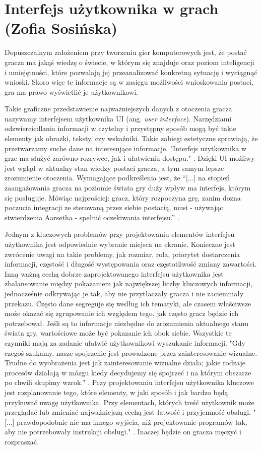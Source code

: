 \section{Interfejs użytkownika w grach (Zofia Sosińska)}\label{c:elem_ui}

Dopuszczalnym założeniem przy tworzeniu gier komputerowych jest, że postać gracza ma jakąś wiedzę o świecie, w którym się znajduje oraz
poziom inteligencji i umiejętności, które pozwalają jej przeanalizować konkretną sytuację i wyciągnąć wnioski. Skoro więc te informacje są w zasięgu możliwości wnioskowania postaci, gra ma prawo wyświetlić je użytkownikowi. 

Takie graficzne przedstawienie najważniejszych danych z otoczenia gracza nazywamy interfejsem użytkownika UI (ang. \textit{user interface}). Narzędziami odzwierciedlania informacji
w czytelny i przystępny sposób mogą być takie elementy jak obrazki, teksty, czy wskaźniki. Takie zabiegi estetyczne sprawiają, że przetwarzamy suche dane
na interesujące informacje. "Interfejs użytkownika w grze ma służyć zarówno rozrywce, jak i ułatwieniu dostępu." \cite{projektowanie_podstawy}.
Dzięki UI możliwy jest wgląd w aktualny stan wiedzy postaci gracza, a tym samym lepsze
zrozumienie otoczenia. Wymagające podkreślenia jest, że “[...] na stopień zaangażowania gracza na poziomie świata gry duży wpływ ma interfejs, którym się posługuje. Mówiąc najprościej:
gracz, który rozpoczyna grę, zanim dozna poczucia integracji ze sterowaną przez siebie postacią, musi - używając stwierdzenia Aarsetha - spełnić oczekiwania interfejsu.” \cite{olbrzymwcieniu}.

Jednym z kluczowych problemów przy projektowaniu elementów interfejsu użytkownika jest odpowiednie wybranie miejsca na ekranie. Konieczne jest zwrócenie uwagi na takie 
problemy, jak  rozmiar, rola, priorytet dostarczenia informacji, częstość i długość występowania oraz częstotliwość zmiany zawartości.
Inną ważną cechą dobrze zaprojektowanego interfejsu użytkownika jest zbalansowanie między pokazaniem jak największej liczby kluczowych informacji, 
jednocześnie odkrywając je tak, aby nie przytłaczały gracza i nie zaciemniały przekazu.
Często dane segreguje się według ich tematyki, ale czasem właściwsze może okazać się zgrupowanie ich 
względem tego, jak często gracz będzie ich potrzebował. Jeśli są to informacje niezbędne do zrozumienia aktualnego 
stanu świata gry, wartościowe może być pokazanie ich obok siebie. Wszystkie te czynniki mają za zadanie ułatwić użytkownikowi
wyszukanie informacji. "Gdy czegoś szukamy, nasze spojrzenie jest prowadzone przez zainteresowanie wizualne.
Trudne do wyobrażenia jest jak zainteresowanie wizualne działa; jakie rodzaje procesów działają w mózgu kiedy decydujemy się spojrzeć i na
którym obszarze po chwili skupimy wzrok." \cite{user_interfaces}. Przy projektowaniu interfejsu użytkownika kluczowe jest rozplanowanie
tego, które elementy, w jaki sposób i jak bardzo będą przykuwać uwagę użytkownika. Przy elementach, których treść użytkownik może przeglądać
lub zmieniać najważniejszą cechą jest łatwość i przyjemność obsługi. "[...] prawdopodobnie nie ma innego wyjścia, niż projektowanie programów tak,
 aby nie potrzebowały instrukcji obsługi." \cite{ui_for_programmers}. Inaczej będzie on gracza męczyć i rozpraszać.


